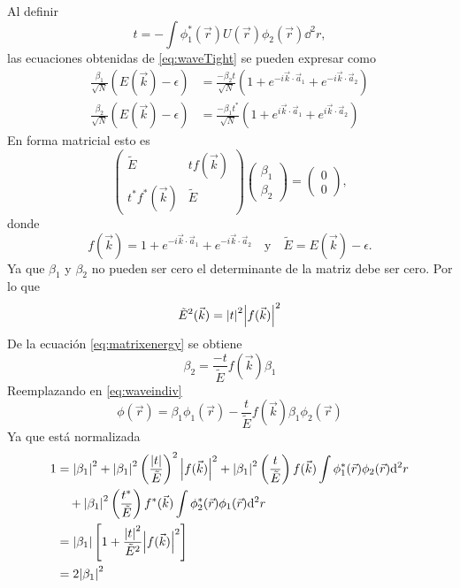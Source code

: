 Al definir 
\begin{equation}
 t = -\int \phi_1^{\ast}(\vec{r}) U(\vec{r}) \phi_2(\vec{r}) \dd^2 r,
\end{equation}
las ecuaciones obtenidas de \eqref{eq:waveTight} se pueden expresar como
\begin{align}
  \frac{\beta_1}{\sqrt{N}}(E(\vec{k})-\epsilon) & =\frac{-\beta_2 t}{\sqrt{N}}\left(1+e^{-i \vec{k}\cdot \vec{a}_1}+e^{-i \vec{k}\cdot \vec{a}_2}\right) \\
  \frac{\beta_2}{\sqrt{N}}(E(\vec{k})-\epsilon)   & =\frac{-\beta_1t^{\ast}}{\sqrt{N}}\left(1+e^{i \vec{k}\cdot \vec{a}_1}+e^{i \vec{k}\cdot \vec{a}_2}\right)
\end{align}
En forma matricial esto es
\begin{equation}
	\begin{pmatrix}
    \tilde{E}                                     & tf(\vec{k}) \\
    t^{\ast}f^{\ast}(\vec{k}) & \tilde{E}
	\end{pmatrix}\begin{pmatrix}
		\beta_1 \\\beta_2
	\end{pmatrix}= \begin{pmatrix}
		0 \\0
	\end{pmatrix},\label{eq:matrixenergy}
\end{equation}
donde
\begin{equation}
  f(\vec{k}) =1+e^{-i \vec{k}\cdot \vec{a}_1}+e^{-i \vec{k}\cdot \vec{a}_2}\quad\text{y}\quad \tilde{E} = E(\vec{k}) - \epsilon.
\end{equation}
Ya que $\beta_1$ y $\beta_2$ no pueden ser cero el determinante de la matriz debe ser cero. Por lo que
\begin{equation}
  \tilde{E}^2(\vec{k}) = \abs{t}^2\abs{f(\vec{k})}^2\label{eq:energysquare}
\end{equation}
De la ecuación \eqref{eq:matrixenergy} se obtiene
\begin{equation}
  \beta_2 = \frac{-t}{\tilde{E}}f(\vec{k})\beta_1
\end{equation}
Reemplazando en \eqref{eq:waveindiv}
\begin{equation}
  \phi(\vec{r}) = \beta_1 \phi_1(\vec{r}) - \frac{t}{\tilde{E}}f(\vec{k})\beta_1 \phi_2(\vec{r})
\end{equation}
Ya que está normalizada
\begin{equation}
  \begin{aligned}[b]
    1 & = \abs{\beta_1}^2 +\abs{\beta_1}^2\left(\frac{\abs{t}}{\tilde{E}}\right)^2\abs{f(\vec{k})}^2+\abs{\beta_1}^2\left(\frac{t}{\tilde{E}}\right)f(\vec{k})\int \phi_1^{\ast}(\vec{r})\phi_2(\vec{r}) \dd^2 r \\&\quad+\abs{\beta_1}^2\left(\frac{t^{\ast}}{\tilde{E}}\right)f^{\ast}(\vec{k})\int \phi_2^{\ast}(\vec{r})\phi_1(\vec{r}) \dd^2 r\\
      & = \abs{\beta_1}\left[1 + \frac{\abs{t}^2}{\tilde{E}^2}\abs{f(\vec{k})}^2\right]\\
	           & = 2\abs{\beta_1}^2
  \end{aligned}
\end{equation}
